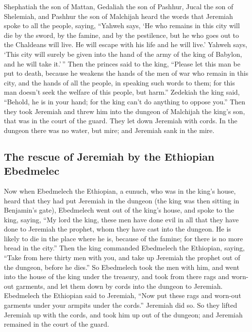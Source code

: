 \begin{paracol}{2}
\begin{otherlanguage}{english}
 Shephatiah the son of Mattan, Gedaliah the son of
Pashhur, Jucal the son of Shelemiah, and Pashhur the son of Malchijah
heard the words that Jeremiah spoke to all the people, saying,
 ``Yahweh says, `He who remains in this city will die by
the sword, by the famine, and by the pestilence, but he who goes out to
the Chaldeans will live. He will escape with his life and he will live.'
 Yahweh says, `This city will surely be given into the
hand of the army of the king of Babylon, and he will take it.'\,''
 Then the princes said to the king, ``Please let this man
be put to death, because he weakens the hands of the men of war who
remain in this city, and the hands of all the people, in speaking such
words to them; for this man doesn't seek the welfare of this people, but
harm.''  Zedekiah the king said, ``Behold, he is in your
hand; for the king can't do anything to oppose you.'' 
Then they took Jeremiah and threw him into the dungeon of Malchijah the
king's son, that was in the court of the guard. They let down Jeremiah
with cords. In the dungeon there was no water, but mire; and Jeremiah
sank in the mire.

\hypertarget{the-rescue-of-jeremiah-by-the-ethiopian-ebedmelec}{%
\subsection{The rescue of Jeremiah by the Ethiopian
Ebedmelec}\label{the-rescue-of-jeremiah-by-the-ethiopian-ebedmelec}}

 Now when Ebedmelech the Ethiopian, a eunuch, who was in
the king's house, heard that they had put Jeremiah in the dungeon (the
king was then sitting in Benjamin's gate),  Ebedmelech
went out of the king's house, and spoke to the king, saying,
 ``My lord the king, these men have done evil in all that
they have done to Jeremiah the prophet, whom they have cast into the
dungeon. He is likely to die in the place where he is, because of the
famine; for there is no more bread in the city.''  Then
the king commanded Ebedmelech the Ethiopian, saying, ``Take from here
thirty men with you, and take up Jeremiah the prophet out of the
dungeon, before he dies.''  So Ebedmelech took the men
with him, and went into the house of the king under the treasury, and
took from there rags and worn-out garments, and let them down by cords
into the dungeon to Jeremiah.  Ebedmelech the Ethiopian
said to Jeremiah, ``Now put these rags and worn-out garments under your
armpits under the cords.'' Jeremiah did so.  So they
lifted Jeremiah up with the cords, and took him up out of the dungeon;
and Jeremiah remained in the court of the guard.


\end{otherlanguage}
\end{paracol}
